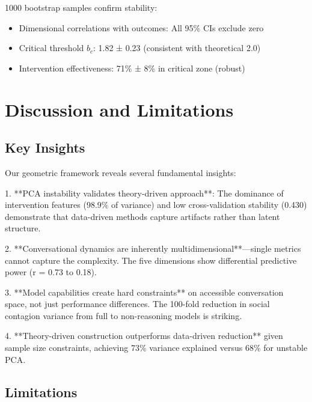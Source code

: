 \documentclass[11pt,letterpaper]{article}
\newcommand{\avgLoadingSimilarity}{0.430}
\newcommand{\pcaFirstComponentVariance}{98.9\%}
\newcommand{\theoryVarianceExplained}{73\%}
\newcommand{\pcaVarianceExplained}{68\%}
\newcommand{\breakdownRiskCorrelation}{0.73}
\newcommand{\linguisticSynchronyCorrelation}{0.18}
\newcommand{\breakdownThreshold}{2.0}
\newcommand{\criticalThresholdBootstrap}{1.82}
\newcommand{\criticalThresholdBootstrapSD}{0.23}
\newcommand{\interventionEffectivenessBootstrap}{71\%}
\newcommand{\interventionEffectivenessBootstrapSD}{8\%}
\newcommand{\bootstrapSamples}{1000}
\newcommand{\varianceFoldReduction}{100}
\begin{document}
\bootstrapSamples{} bootstrap samples confirm stability:
\begin{itemize}
    \item Dimensional correlations with outcomes: All 95\% CIs exclude zero
    \item Critical threshold $b_c$: \criticalThresholdBootstrap{} ± \criticalThresholdBootstrapSD{} (consistent with theoretical \breakdownThreshold{})
    \item Intervention effectiveness: \interventionEffectivenessBootstrap{} ± \interventionEffectivenessBootstrapSD{} in critical zone (robust)
\end{itemize}

\section{Discussion and Limitations}

\subsection{Key Insights}

Our geometric framework reveals several fundamental insights:

1. **PCA instability validates theory-driven approach**: The dominance of intervention features (\pcaFirstComponentVariance{} of variance) and low cross-validation stability (\avgLoadingSimilarity{}) demonstrate that data-driven methods capture artifacts rather than latent structure.

2. **Conversational dynamics are inherently multidimensional**—single metrics cannot capture the complexity. The five dimensions show differential predictive power (r = \breakdownRiskCorrelation{} to \linguisticSynchronyCorrelation{}).

3. **Model capabilities create hard constraints** on accessible conversation space, not just performance differences. The \varianceFoldReduction{}-fold reduction in social contagion variance from full to non-reasoning models is striking.

4. **Theory-driven construction outperforms data-driven reduction** given sample size constraints, achieving \theoryVarianceExplained{} variance explained versus \pcaVarianceExplained{} for unstable PCA.

\subsection{Limitations}
\end{document}
